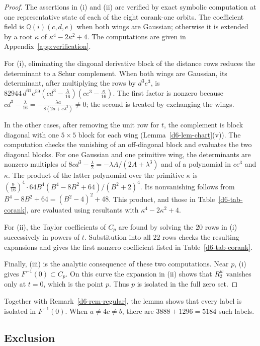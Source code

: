 \documentclass[11pt]{amsart}
\theoremstyle{definition}
\theoremstyle{remark}
\begin{document}
{
\begin{proof}
The assertions in (i) and (ii) are verified by exact symbolic computation
at one representative state of each of the eight corank-one orbits.
The coefficient field is $\mathbb Q(i)(c,d,e)$ when both wings are Gaussian;
otherwise it is extended by a root $\kappa$ of $\kappa^4-2\kappa^2+4$.
The computations are given in Appendix~\ref{app:verification}.

For (i), eliminating the diagonal derivative block of the distance rows
reduces the determinant to a Schur complement.
When both wings are Gaussian, its determinant, after multiplying the
rows by $d^3e^3$, is
$82944\,d^{61}e^{59}(cd^3-\frac{\lambda}{16})(ce^3-\frac{\kappa}{16})$.
The first factor is nonzero because
$cd^3-\frac{\lambda}{16}=-\frac{\lambda a}{8(2a+c\lambda^3)}\ne0$;
the second is treated by exchanging the wings.

In the other cases, after removing the unit row for $t$, the complement
is block diagonal with one $5\times5$ block for each wing
(Lemma~\ref{d6-lem-chart}(v)).  The computation checks the vanishing of an
off-diagonal block and evaluates the two diagonal blocks.
For one Gaussian and one primitive wing, the determinants are nonzero
multiples of $8cd^3-\frac{\lambda}{2}=-\lambda A/(2A+\lambda^3)$ and of
a polynomial in $ce^3$ and $\kappa$.  The product of the latter polynomial
over the primitive $\kappa$ is
$(\frac9{16})^4\cdot64B^4(B^4-8B^2+64)/(B^2+2)^4$.
Its nonvanishing follows from $B^4-8B^2+64=(B^2-4)^2+48$.
This product, and those in Table~\ref{d6-tab-corank}, are evaluated using
resultants with $\kappa^4-2\kappa^2+4$.

For (ii), the Taylor coefficients of $C_p$ are found by solving the
$20$ rows in (i) successively in powers of $t$.  Substitution into all
$22$ rows checks the resulting expansions and gives the first nonzero
coefficient listed in Table~\ref{d6-tab-corank}.

Finally, (iii) is the analytic consequence of these two computations.
Near $p$, (i) gives $F^{-1}(0)\subset C_p$.
On this curve the expansion in (ii) shows that
$R^w_2$ vanishes only at $t=0$, which is the point $p$.
Thus $p$ is isolated in the full zero set.
\end{proof}

Together with Remark~\ref{d6-rem-regular}, the lemma shows that every
label is isolated in $F^{-1}(0)$.  When $a\ne4c\ne b$, there are
$3888+1296=5184$ such labels.
}

\subsection{Exclusion}
\end{document}
